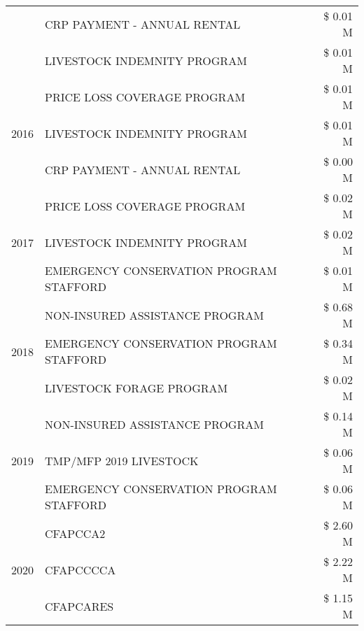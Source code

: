 \begin{tabular}{llr}
 & CRP PAYMENT - ANNUAL RENTAL & \$ 0.01 M \\
 & LIVESTOCK INDEMNITY PROGRAM & \$ 0.01 M \\
\cline{1-3}
\multirow[t]{3}{*}{2016} & PRICE LOSS COVERAGE PROGRAM & \$ 0.01 M \\
 & LIVESTOCK INDEMNITY PROGRAM & \$ 0.01 M \\
 & CRP PAYMENT - ANNUAL RENTAL & \$ 0.00 M \\
\cline{1-3}
\multirow[t]{3}{*}{2017} & PRICE LOSS COVERAGE PROGRAM & \$ 0.02 M \\
 & LIVESTOCK INDEMNITY PROGRAM & \$ 0.02 M \\
 & EMERGENCY CONSERVATION PROGRAM STAFFORD & \$ 0.01 M \\
\cline{1-3}
\multirow[t]{3}{*}{2018} & NON-INSURED ASSISTANCE PROGRAM & \$ 0.68 M \\
 & EMERGENCY CONSERVATION PROGRAM STAFFORD & \$ 0.34 M \\
 & LIVESTOCK FORAGE PROGRAM & \$ 0.02 M \\
\cline{1-3}
\multirow[t]{3}{*}{2019} & NON-INSURED ASSISTANCE PROGRAM & \$ 0.14 M \\
 & TMP/MFP 2019 LIVESTOCK & \$ 0.06 M \\
 & EMERGENCY CONSERVATION PROGRAM STAFFORD & \$ 0.06 M \\
\cline{1-3}
\multirow[t]{3}{*}{2020} & CFAPCCA2 & \$ 2.60 M \\
 & CFAPCCCCA & \$ 2.22 M \\
 & CFAPCARES & \$ 1.15 M \\
\cline{1-3}
\bottomrule
\end{tabular}
